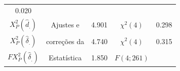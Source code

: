 \documentclass[]{book}
\theoremstyle{definition}
\theoremstyle{definition}
\theoremstyle{definition}
\theoremstyle{remark}
\begin{document}
\begin{longtable}[]{@{}cclcr@{}}
\begin{minipage}[t]{0.07\columnwidth}
0.020\strut
\end{minipage}\tabularnewline
\begin{minipage}[t]{0.40\columnwidth}\centering\strut
\(X_{P}^{2}\left( \hat{d}_{.}\right)\)\strut
\end{minipage} & \begin{minipage}[t]{0.15\columnwidth}\centering\strut
Ajustes e\strut
\end{minipage} & \begin{minipage}[t]{0.05\columnwidth}\raggedright\strut
4.901\strut
\end{minipage} & \begin{minipage}[t]{0.19\columnwidth}\centering\strut
\(\chi ^{2}(4)\)\strut
\end{minipage} & \begin{minipage}[t]{0.07\columnwidth}\raggedleft\strut
0.298\strut
\end{minipage}\tabularnewline
\begin{minipage}[t]{0.40\columnwidth}\centering\strut
\(X_{P}^{2}\left( \hat{\delta}_{.}\right)\)\strut
\end{minipage} & \begin{minipage}[t]{0.15\columnwidth}\centering\strut
correções da\strut
\end{minipage} & \begin{minipage}[t]{0.05\columnwidth}\raggedright\strut
4.740\strut
\end{minipage} & \begin{minipage}[t]{0.19\columnwidth}\centering\strut
\(\chi ^{2}(4)\)\strut
\end{minipage} & \begin{minipage}[t]{0.07\columnwidth}\raggedleft\strut
0.315\strut
\end{minipage}\tabularnewline
\begin{minipage}[t]{0.40\columnwidth}\centering\strut
\(FX_{P}^{2}\left( \hat{\delta}_{.}\right)\)\strut
\end{minipage} & \begin{minipage}[t]{0.15\columnwidth}\centering\strut
Estatística\strut
\end{minipage} & \begin{minipage}[t]{0.05\columnwidth}\raggedright\strut
1.850\strut
\end{minipage} & \begin{minipage}[t]{0.19\columnwidth}\centering\strut
\(F\left( 4;261\right)\)\strut
\end{minipage} & \begin{minipage}[t]{0.07\columnwidth}\raggedleft\strut

\end{minipage}
\end{longtable}
\end{document}
